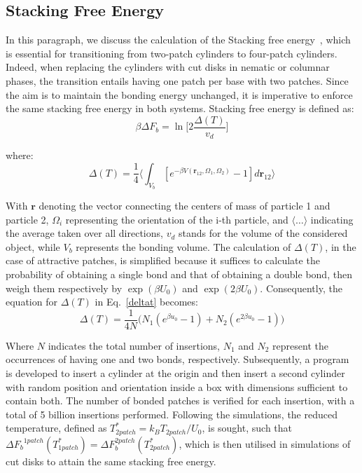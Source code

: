 \documentclass[aip,jcp, amsmath, amssymb, reprint]{revtex4-1}
\begin{document}
\subsection{Stacking Free Energy}

In this paragraph, we discuss the calculation of the Stacking free energy~\cite{Michele}, which is essential for
transitioning from two-patch cylinders to four-patch cylinders. Indeed, when replacing the cylinders with cut disks in
nematic or columnar phases, the transition entails having one patch per base with two patches. Since the aim is to
maintain the bonding energy unchanged, it is imperative to enforce the same stacking free energy in both systems.
Stacking free energy is defined as:
\begin{equation}
	\beta\Delta F_b=\ln \bigg[2\frac{\Delta(T)}{v_d}\bigg]
	\label{deltaf}
\end{equation}

where:
\begin{equation}
\label{deltat}
	\Delta(T)=\frac{1}{4}\bigg\langle \int_{V_b} [e^{-\beta V(\textbf{r}_{12}, \Omega_1, \Omega_2)}-1]d\textbf{r}_{12}\bigg\rangle
\end{equation}

With $\textbf{r}$ denoting the vector connecting the centers of mass of particle 1 and particle 2, $\Omega_i$
representing the orientation of the i-th particle, and $\langle\ldots\rangle$ indicating the average taken over all
directions, $v_d$ stands for the volume of the considered object, while $V_b$ represents the bonding volume. The
calculation of $\Delta (T)$, in the case of attractive patches, is simplified because it suffices to calculate the
probability of obtaining a single bond and that of obtaining a double bond, then weigh them respectively by $\exp(\beta
U_0)$ and $\exp(2\beta U_0)$. Consequently, the equation for $\Delta (T)$ in Eq.~\eqref{deltat} becomes:
\begin{equation}
\label{deltat2}
	\Delta(T)=\frac{1}{4N}\big( N_1(e^{\beta u_0}-1)+N_2(e^{2\beta u_0}-1)\big)
\end{equation}

Where $N$ indicates the total number of insertions, $N_1$ and $N_2$ represent the occurrences of having one and two
bonds, respectively. Subsequently, a program is developed to insert a cylinder at the origin and then insert a second
cylinder with random position and orientation inside a box with dimensions sufficient to contain both. The number of
bonded patches is verified for each insertion, with a total of 5 billion insertions performed. Following the
simulations, the reduced temperature, defined as $T^*_{2 patch}=k_B T_{2 patch}/U_0$, is sought, such that 
${\Delta F_b}^{1 patch}(T^*_{1 patch})=\Delta F_b^{2 patch}(T^*_{2 patch})$, which is then utilised in simulations of cut disks to attain
the same stacking free energy.
\end{document}
